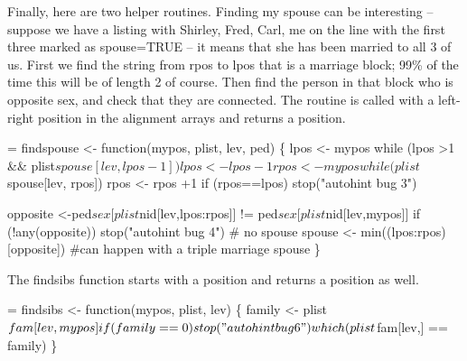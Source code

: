 \documentclass{article}
\begin{document}
Finally, here are two helper routines.
Finding my spouse can be interesting -- suppose we have a listing with
Shirley, Fred, Carl, me on the line with the first three marked as
spouse=TRUE -- it means that she has been married to all 3 of us.
First we find the string from rpos to lpos that is a marriage block;
99\% of the time this will be of length 2 of course.  Then find
the person in that block who is opposite sex, and check that they
are connected.
The routine is called with a left-right position in the alignment
arrays and returns a position.
\begin{nwchunk}
=
 findspouse <- function(mypos, plist, lev, ped) \{
     lpos <- mypos
     while (lpos >1 && plist$spouse[lev, lpos-1]) lpos <- lpos-1
     rpos <- mypos
     while(plist$spouse[lev, rpos]) rpos <- rpos +1
     if (rpos==lpos) stop("autohint bug 3")
     
     opposite <-ped$sex[plist$nid[lev,lpos:rpos]] != ped$sex[plist$nid[lev,mypos]]
     if (!any(opposite)) stop("autohint bug 4")  # no spouse
     spouse <- min((lpos:rpos)[opposite])  #can happen with a triple marriage
     spouse
     \}
\end{nwchunk}

The findsibs function starts with a position and returns a position as well.
\begin{nwchunk}
=
 findsibs <- function(mypos, plist, lev) \{
     family <- plist$fam[lev, mypos]
     if (family==0) stop("autohint bug 6")
     which(plist$fam[lev,] == family)
     \}
\end{nwchunk}
\end{document}
